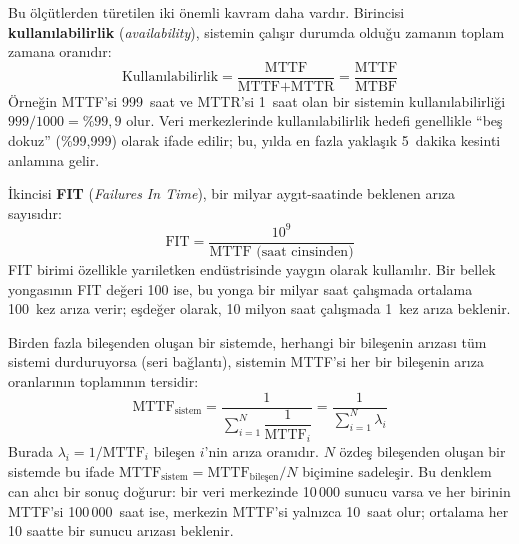 Bu ölçütlerden türetilen iki önemli kavram daha vardır. Birincisi \textbf{kullanılabilirlik} (\emph{availability}), sistemin çalışır durumda olduğu zamanın toplam zamana oranıdır:
%
\begin{equation}
\text{Kullanılabilirlik} = \frac{\text{MTTF}}{\text{MTTF} + \text{MTTR}} = \frac{\text{MTTF}}{\text{MTBF}}
\label{eq:kullanilabilirlik}
\end{equation}
%
Örneğin MTTF'si 999~saat ve MTTR'si 1~saat olan bir sistemin kullanılabilirliği $999/1000 = \%99{,}9$ olur. Veri merkezlerinde kullanılabilirlik hedefi genellikle ``beş dokuz'' (\%99,999) olarak ifade edilir; bu, yılda en fazla yaklaşık 5~dakika kesinti anlamına gelir.

İkincisi \textbf{FIT} (\emph{Failures In Time}), bir milyar aygıt-saatinde beklenen arıza sayısıdır:
%
\begin{equation}
\text{FIT} = \frac{10^9}{\text{MTTF (saat cinsinden)}}
\label{eq:fit}
\end{equation}
%
FIT birimi özellikle yarıiletken endüstrisinde yaygın olarak kullanılır. Bir bellek yongasının FIT değeri 100 ise, bu yonga bir milyar saat çalışmada ortalama 100~kez arıza verir; eşdeğer olarak, 10 milyon saat çalışmada 1~kez arıza beklenir.

Birden fazla bileşenden oluşan bir sistemde, herhangi bir bileşenin arızası tüm sistemi durduruyorsa (seri bağlantı), sistemin MTTF'si her bir bileşenin arıza oranlarının toplamının tersidir:
%
\begin{equation}
\text{MTTF}_{\text{sistem}} = \frac{1}{\displaystyle\sum_{i=1}^{N} \dfrac{1}{\text{MTTF}_i}} = \frac{1}{\displaystyle\sum_{i=1}^{N} \lambda_i}
\label{eq:mttf-sistem}
\end{equation}
%
Burada $\lambda_i = 1/\text{MTTF}_i$ bileşen $i$'nin arıza oranıdır. $N$ özdeş bileşenden oluşan bir sistemde bu ifade $\text{MTTF}_{\text{sistem}} = \text{MTTF}_{\text{bileşen}} / N$ biçimine sadeleşir. Bu denklem can alıcı bir sonuç doğurur: bir veri merkezinde 10\,000 sunucu varsa ve her birinin MTTF'si 100\,000~saat ise, merkezin MTTF'si yalnızca 10~saat olur; ortalama her 10 saatte bir sunucu arızası beklenir.

